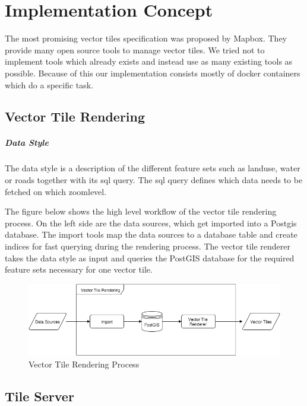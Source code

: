 \chapter{Implementation Concept}

The most promising vector tiles specification was proposed by Mapbox.
They provide many open source tools to manage vector tiles. We tried not to implement tools which already exists and instead use as many existing tools as possible. Because of this our implementation consists mostly of docker containers which do a specific task.

\section{Vector Tile Rendering}

\paragraph{Data Style} The data style is a description of the different feature sets such as landuse, water or roads together with its sql query. The sql query defines which data needs to be fetched on which zoomlevel.

The figure below shows the high level workflow of the vector tile rendering process. On the left side are the data sources, which get imported into a Postgis database. The import tools map the data sources to a database table and create indices for fast querying during the rendering process.
The vector tile renderer takes the data style as input and queries the PostGIS database for the required feature sets necessary for one vector tile.


\begin{figure}[h]
  \centering
  \includegraphics[width=1\textwidth]{images/vector_tile_rendering.png}
  \caption{Vector Tile Rendering Process}
\end{figure}

\section{Tile Server}

